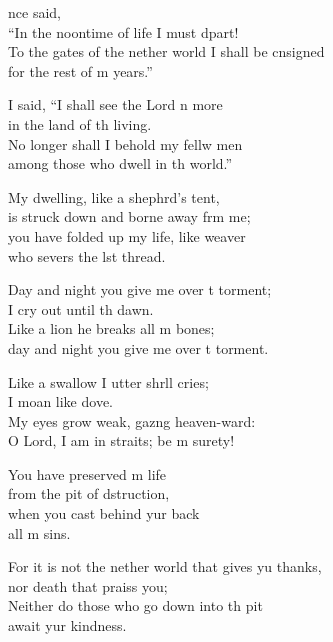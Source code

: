 \begin{psalmverse}
  \begin{patverse}
    nce  said,\Med\\
“In the noontime of life I must dpart!\\
To the gates of the nether world I shall be cnsigned\Med\\
for the rest of m years.”

I said, “I shall see the Lord n more\Med\\
in the land of th living.\\
No longer shall I behold my fellw men\Med\\
among those who dwell in th world.”

My dwelling, like a shephrd’s tent,\Med\\
is struck down and borne away frm me;\\
you have folded up my life, like  weaver\Med\\
who severs the lst thread.

Day and night you give me over t torment;\Med\\
I cry out until th dawn.\\
Like a lion he breaks all m bones;\Med\\
day and night you give me over t torment.

Like a swallow I utter shr\pointup{\i}ll cries;\Med\\
I moan like  dove.\\
My eyes grow weak, gaz\pointup{\i}ng heaven-ward:\Med\\
O Lord, I am in straits; be m surety!

You have preserved m life\Med\\
from the pit of dstruction,\\
when you cast behind yur back\Med\\
all m sins.

For it is not the nether world that gives yu thanks,\Med\\
nor death that praiss you;\\
Neither do those who go down into th pit\Med\\
await yur kindness.


\end{patverse}
\end{psalmverse}
